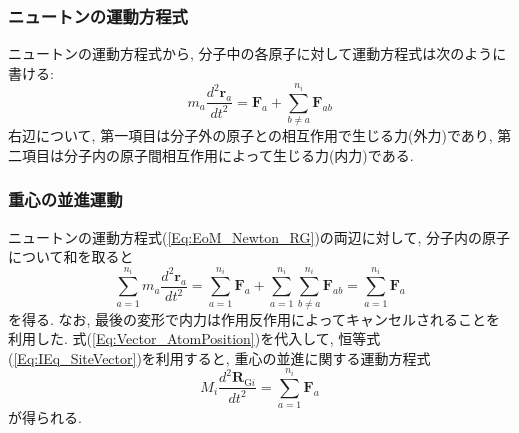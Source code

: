 \subsubsection{ニュートンの運動方程式}

ニュートンの運動方程式から, 分子中の各原子に対して運動方程式は次のように書ける:
\begin{equation}
  m_{a} \frac{d^{2} \bm{r}_{a}}{dt^{2}}
  =
  \bm{F}_{a} + \sum_{b \neq a}^{n_{i}} \bm{F}_{ab}
  \label{Eq:EoM_Newton_RG}
\end{equation}
右辺について, 第一項目は分子外の原子との相互作用で生じる力(外力)であり, 第二項目は分子内の原子間相互作用によって生じる力(内力)である. 

\subsubsection{重心の並進運動}
ニュートンの運動方程式(\ref{Eq:EoM_Newton_RG})の両辺に対して, 分子内の原子について和を取ると
\begin{equation}
  \sum_{a=1}^{n_{i}} m_{a} \frac{d^{2} \bm{r}_{a}}{dt^{2}}
  =
  \sum_{a=1}^{n_{i}} \bm{F}_{a}
  +
  \sum_{a=1}^{n_{i}} \sum_{b \neq a}^{n_{i}} \bm{F}_{ab}
  =
  \sum_{a=1}^{n_{i}} \bm{F}_{a}
\end{equation}
を得る. なお, 最後の変形で内力は作用反作用によってキャンセルされることを利用した.
式(\ref{Eq:Vector_AtomPosition})を代入して, 恒等式(\ref{Eq:IEq_SiteVector})を利用すると, 重心の並進に関する運動方程式
\begin{equation}
  M_{i} \frac{d^{2} \bm{R}_{\mathrm{G}i}}{dt^{2}} = \sum_{a=1}^{n_{i}} \bm{F}_{a}
  \label{Eq:EoM_CoM_Translocate}
\end{equation}
が得られる.


